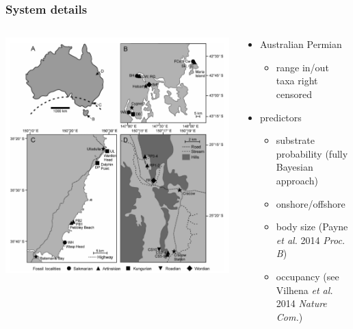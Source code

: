 \documentclass{beamer}
\begin{document}
\begin{frame}
  \frametitle{System details}
  \begin{columns}
    \begin{column}{0.5\textwidth}
      \includegraphics[height = 0.8\textheight, width = \textwidth, keepaspectratio = true]{figure/australia}

      \tiny{}
    \end{column}
    \begin{column}{0.5\textwidth}
      \begin{itemize}
        \item Australian Permian
          \begin{itemize}
            \item range in/out taxa right censored
          \end{itemize}
        \item predictors 
          \begin{itemize}
            \item substrate probability (fully Bayesian approach)
            \item onshore/offshore
            \item body size (Payne \textit{et al.} 2014 \textit{Proc. B})
            \item occupancy (see Vilhena \textit{et al.} 2014 \textit{Nature Com.})
          \end{itemize}
      \end{itemize}
    \end{column}
  \end{columns}
\end{frame}
\end{document}
